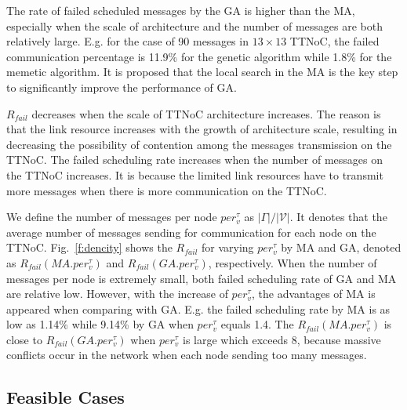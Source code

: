 \documentclass[10pt,journal]{IEEEtran}
\newcommand{\calV}{\mathcal{V}}
\theoremstyle{remark}
\begin{document}
The rate of failed scheduled messages by the GA is higher than the MA, especially when the scale of architecture and the number of messages are both relatively large.
E.g. for the case of 90 messages in $13\times 13$ TTNoC,
 the failed communication percentage is 11.9\% for the genetic algorithm while 1.8\% for the memetic algorithm.
It is proposed that the local search in the MA is the key step to significantly improve the performance of GA.

$R_{fail}$ decreases when the scale of TTNoC architecture increases. 
The reason is that the link resource increases with the growth of architecture scale,
 resulting in decreasing the possibility of contention among the messages transmission on the TTNoC.
The failed scheduling rate increases when the number of messages on the TTNoC increases.
It is because the limited link resources have to transmit more messages when there is more communication on the TTNoC.

We define the number of messages per node $per^\tau_v$ as 
$|\Gamma|/|\calV|$.
It denotes that the average number of messages sending for communication for each node on the TTNoC.
Fig.~\ref{f:dencity} shows the $R_{fail}$ for varying $per^\tau_v$ by MA and GA, denoted as $R_{fail}({MA.per^\tau_v})$ and $R_{fail}(GA.per^\tau_v)$, respectively. 
When the number of messages per node is extremely small, both failed scheduling rate of GA and MA are relative low.
However, with the increase of $per^\tau_v$, the advantages of MA is appeared when comparing with GA.
E.g. the failed scheduling rate by MA is as low as 1.14\% while 9.14\% by GA when $per^\tau_v$ equals 1.4.
The $R_{fail}({MA.per^\tau_v})$ is close to $R_{fail}({GA.per^\tau_v})$ when $per^\tau_v$ is large which exceeds 8, 
 because massive conflicts occur in the network when each node sending too many messages.

\subsection{Feasible Cases}
\end{document}
